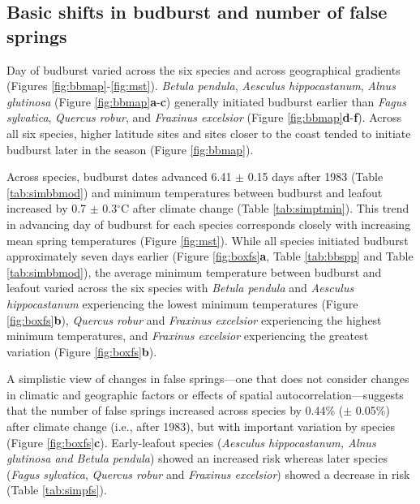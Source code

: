 \documentclass{article}\usepackage[]{graphicx}\usepackage[]{color}
\begin{document}
\subsection*{Basic shifts in budburst and number of false springs}
Day of budburst varied across the six species and across geographical gradients (Figures \ref{fig:bbmap}-\ref{fig:mst}). \textit{Betula pendula}, \textit{Aesculus hippocastanum}, \textit{Alnus glutinosa} (Figure \ref{fig:bbmap}\textbf{a}-\textbf{c}) generally initiated budburst earlier than \textit{Fagus sylvatica}, \textit{Quercus robur}, and \textit{Fraxinus excelsior} (Figure \ref{fig:bbmap}\textbf{d}-\textbf{f}). Across all six species, higher latitude sites and sites closer to the coast tended to initiate budburst later in the season (Figure \ref{fig:bbmap}).  

Across species, budburst dates advanced 6.41 $\pm$ 0.15 days after 1983 (Table \ref{tab:simbbmod}) and minimum temperatures between budburst and leafout increased by 0.7 $\pm$ 0.3$^{\circ}$C after climate change (Table \ref{tab:simptmin}). This trend in advancing day of budburst for each species corresponds closely with increasing mean spring temperatures (Figure \ref{fig:mst}). While all species initiated budburst approximately seven days earlier (Figure \ref{fig:boxfs}\textbf{a}, Table \ref{tab:bbspp} and Table \ref{tab:simbbmod}), the average minimum temperature between budburst and leafout varied across the six species with \textit{Betula pendula} and \textit{Aesculus hippocastanum} experiencing the lowest minimum temperatures (Figure \ref{fig:boxfs}\textbf{b}), \textit{Quercus robur} and \textit{Fraxinus excelsior} experiencing the highest minimum temperatures, and \textit{Fraxinus excelsior} experiencing the greatest variation (Figure \ref{fig:boxfs}\textbf{b}). 

A simplistic view of changes in false springs---one that does not consider changes in climatic and geographic factors or effects of spatial autocorrelation---suggests that the number of false springs increased across species by 0.44\% ($\pm$ 0.05\%) after climate change (i.e., after 1983), but with important variation by species (Figure \ref{fig:boxfs}\textbf{c}). Early-leafout species (\textit{Aesculus hippocastanum, \textit{Alnus glutinosa} and \textit{Betula pendula}}) showed an increased risk whereas later species (\textit{Fagus sylvatica}, \textit{Quercus robur} and \textit{Fraxinus excelsior}) showed a decrease in risk (Table \ref{tab:simpfs}). 
\end{document}
